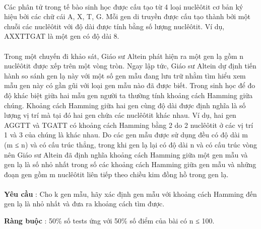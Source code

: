  

Các phân tử trong tế bào sinh học được cấu tạo từ 4 loại nuclêôtit cơ bản ký hiệu bởi các chữ cái A, X, T, G. Mỗi gen di truyền được cấu tạo thành bởi một chuỗi các nuclêôtit với độ dài được tính bằng số lượng nuclêôtit. Ví dụ, AXXTTGAT là một gen có độ dài 8.
\\
\\Trong một chuyến đi khảo sát, Giáo sư Altein phát hiện ra một gen lạ gồm n nuclêôtit được xếp trên một vòng tròn. Ngay lập tức, Giáo sư Altein dự định tiến hành so sánh gen lạ này với một số gen mẫu đang lưu trữ nhằm tìm hiểu xem mẫu gen này có gần gũi với loại gen mẫu nào đã được biết. Trong sinh học để đo độ khác biệt giữa hai mẫu gen người ta thường tính khoảng cách Hamming giữa chúng. Khoảng cách Hamming giữa hai gen cùng độ dài được định nghĩa là số lượng vị trí mà tại đó hai gen chứa các nuclêôtit khác nhau. Ví dụ, hai gen AGGTT và TGATT có khoảng cách Hamming bằng 2 do 2 nuclêôtit ở các vị trí 1 và 3 của chúng là khác nhau. Do các gen mẫu được sử dụng đều có độ dài m (m ≤ n) và có cấu trúc thẳng, trong khi gen lạ lại có độ dài n và có cấu trúc vòng nên Giáo sư Altein đã định nghĩa khoảng cách Hamming giữa một gen mẫu và gen lạ là số nhỏ nhất trong số các khoảng cách Hamming giữa gen mẫu và những đoạn gen gồm m nuclêôtit liên tiếp theo chiều kim đồng hồ trong gen lạ.
\\
\\\textbf{Yêu cầu } : Cho k gen mẫu, hãy xác định gen mẫu với khoảng cách Hamming đến gen lạ là nhỏ nhất và đưa ra khoảng cách tìm được.

\textbf{Ràng buộc } : 50\% số tests ứng với 50\% số điểm của bài có n ≤ 100.
